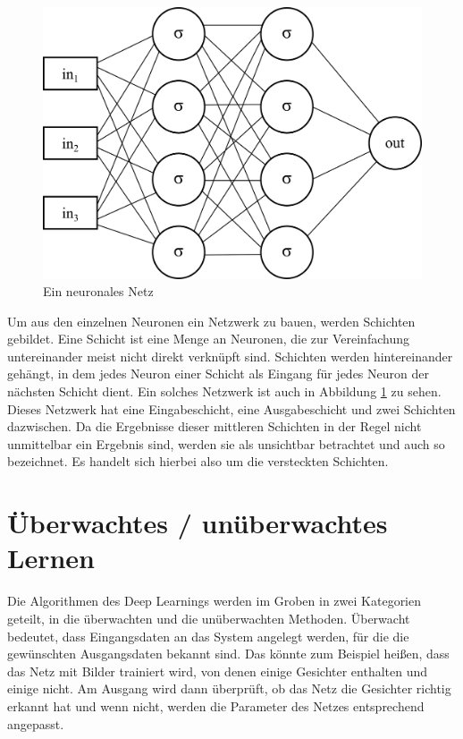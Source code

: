 \begin{figure}
	\centering
		\includegraphics[scale=1]{images/neuron-network.png}
	\caption{Ein neuronales Netz}
	\label{fig:neuron-network}
\end{figure}

Um aus den einzelnen Neuronen ein Netzwerk zu bauen, werden Schichten gebildet. Eine Schicht ist eine Menge an Neuronen, die zur Vereinfachung untereinander meist nicht direkt verknüpft sind. Schichten werden hintereinander gehängt, in dem jedes Neuron einer Schicht als Eingang für jedes Neuron der nächsten Schicht dient. Ein solches Netzwerk ist auch in Abbildung \ref{fig:neuron-network} zu sehen. Dieses Netzwerk hat eine Eingabeschicht, eine Ausgabeschicht und zwei Schichten dazwischen. Da die Ergebnisse dieser mittleren Schichten in der Regel nicht unmittelbar ein Ergebnis sind, werden sie als unsichtbar betrachtet und auch so bezeichnet. Es handelt sich hierbei also um die versteckten Schichten.

\section{Überwachtes / unüberwachtes Lernen}

Die Algorithmen des Deep Learnings werden im Groben in zwei Kategorien geteilt, in die überwachten und die unüberwachten Methoden. Überwacht bedeutet, dass Eingangsdaten an das System angelegt werden, für die die gewünschten Ausgangsdaten bekannt sind. Das könnte zum Beispiel heißen, dass das Netz mit Bilder trainiert wird, von denen einige Gesichter enthalten und einige nicht. Am Ausgang wird dann überprüft, ob das Netz die Gesichter richtig erkannt hat und wenn nicht, werden die Parameter des Netzes entsprechend angepasst.

